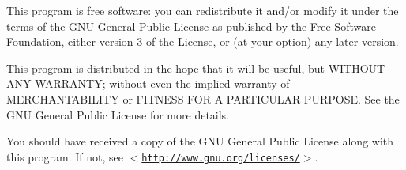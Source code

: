 \-This program is free software\-: you can redistribute it and/or modify it under the terms of the \-G\-N\-U \-General \-Public \-License as published by the \-Free \-Software \-Foundation, either version 3 of the \-License, or (at your option) any later version.

\-This program is distributed in the hope that it will be useful, but \-W\-I\-T\-H\-O\-U\-T \-A\-N\-Y \-W\-A\-R\-R\-A\-N\-T\-Y; without even the implied warranty of \-M\-E\-R\-C\-H\-A\-N\-T\-A\-B\-I\-L\-I\-T\-Y or \-F\-I\-T\-N\-E\-S\-S \-F\-O\-R \-A \-P\-A\-R\-T\-I\-C\-U\-L\-A\-R \-P\-U\-R\-P\-O\-S\-E. \-See the \-G\-N\-U \-General \-Public \-License for more details.

\-You should have received a copy of the \-G\-N\-U \-General \-Public \-License along with this program. \-If not, see $<$\href{http://www.gnu.org/licenses/}{\tt http\-://www.\-gnu.\-org/licenses/}$>$. 
